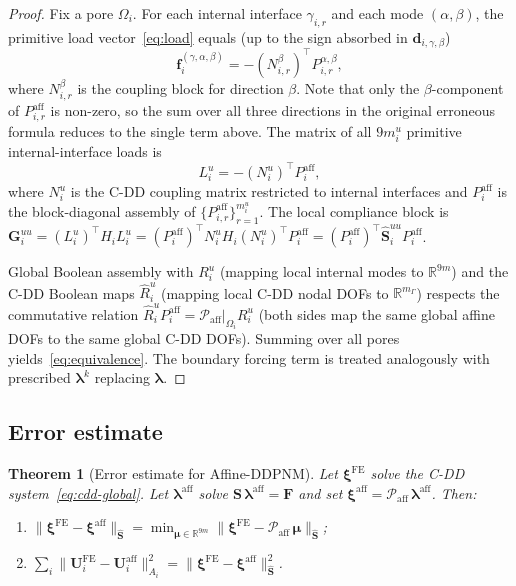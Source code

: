 \documentclass[11pt,a4paper]{article}
\newtheorem{theorem}[lemma]{Theorem}
\newcommand{\R}{\mathbb{R}}
\newcommand{\pore}[1]{\Omega_{#1}}
\newcommand{\iface}{\gamma}
\newcommand{\trac}{\bm{\lambda}}
\newcommand{\DtN}{\mathbf{G}}
\newcommand{\Schur}{\mathbf{S}}
\newcommand{\loadvec}{\bm{f}}
\newcommand{\respvel}{\mathbf{U}}
\begin{document}
\begin{proof}
  Fix a pore $\pore{i}$.  For each internal interface $\iface_{i,r}$ and
  each mode $(\alpha,\beta)$, the primitive load vector~\eqref{eq:load}
  equals (up to the sign absorbed in $\bm{d}_{i,\gamma,\beta}$)
  \[
    \loadvec_i^{(\gamma,\alpha,\beta)}
    = -(N_{i,r}^{\beta})^\top P_{i,r}^{\alpha,\beta},
  \]
  where $N_{i,r}^{\beta}$ is the coupling block for direction $\beta$.
  Note that only the $\beta$-component of $P_{i,r}^{\text{aff}}$ is
  non-zero, so the sum over all three directions in the original
  erroneous formula reduces to the single term above.
  The matrix of all $9m_i^u$ primitive internal-interface loads is
  \[
    L_i^u = -(N_i^u)^\top P_i^{\text{aff}},
  \]
  where $N_i^u$ is the C-DD coupling matrix restricted to internal
  interfaces and $P_i^{\text{aff}}$ is the block-diagonal assembly of
  $\{P_{i,r}^{\text{aff}}\}_{r=1}^{m_i^u}$.  The local compliance block is
  $\DtN_i^{uu} = (L_i^u)^\top H_i L_i^u
   = (P_i^{\text{aff}})^\top N_i^u H_i (N_i^u)^\top P_i^{\text{aff}}
   = (P_i^{\text{aff}})^\top \widehat{\Schur}_i^{uu} P_i^{\text{aff}}$.

  Global Boolean assembly with $R_i^u$ (mapping local internal modes to
  $\R^{9m}$) and the C-DD Boolean maps $\widehat{R}_i^u$ (mapping local
  C-DD nodal DOFs to $\R^{m_\Gamma}$) respects the commutative relation
  $\widehat{R}_i^u P_i^{\text{aff}}
   = \mathcal{P}_{\text{aff}}|_{\pore{i}} R_i^u$
  (both sides map the same global affine DOFs to the same global C-DD
  DOFs).  Summing over all pores yields~\eqref{eq:equivalence}.
  The boundary forcing term is treated analogously with prescribed
  $\trac^k$ replacing $\trac$.
\end{proof}

\subsection{Error estimate}

\begin{theorem}[Error estimate for Affine-DDPNM]\label{thm:error}
  Let $\bm{\xi}^{\text{FE}}$ solve the C-DD system~\eqref{eq:cdd-global}.
  Let $\trac^{\text{aff}}$ solve $\Schur\,\trac^{\text{aff}} = \bm{F}$ and
  set $\bm{\xi}^{\text{aff}} = \mathcal{P}_{\text{aff}}\,\trac^{\text{aff}}$.
  Then:
  \begin{enumerate}[label=(\roman*),nosep]
    \item $\|\bm{\xi}^{\text{FE}} - \bm{\xi}^{\text{aff}}\|_{\widehat{\Schur}}
       = \min_{\bm{\mu}\in\R^{9m}}
         \|\bm{\xi}^{\text{FE}}
           - \mathcal{P}_{\text{aff}}\,\bm{\mu}\|_{\widehat{\Schur}}$\label{eq:err-est};
    \item $\sum_i \|\respvel_i^{\text{FE}}
           - \respvel_i^{\text{aff}}\|_{A_i}^2
       = \|\bm{\xi}^{\text{FE}}
         - \bm{\xi}^{\text{aff}}\|_{\widehat{\Schur}}^2$.
  \end{enumerate}
\end{theorem}
\end{document}
